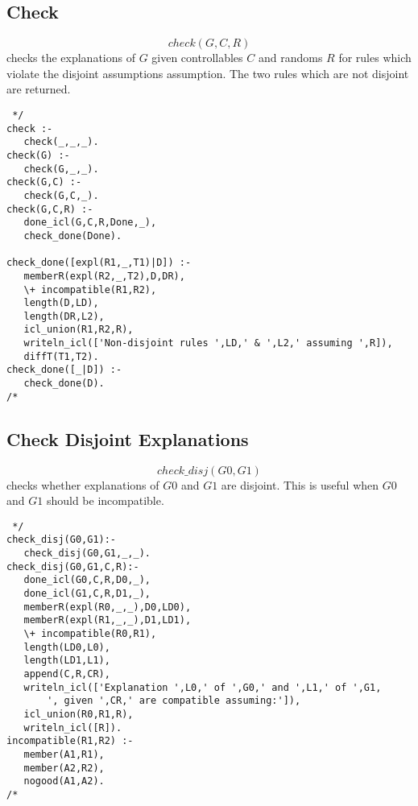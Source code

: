 \documentclass[11pt,fleqn]{article}
\begin{document}
\subsection{Check}
\[check(G,C,R)\] 
checks the explanations of $G$ given controllables $C$ and randoms $R$ 
for rules which violate the disjoint
assumptions assumption. The two rules which are not disjoint are returned.

\begin{verbatim} */
check :- 
   check(_,_,_).
check(G) :-
   check(G,_,_).
check(G,C) :-
   check(G,C,_).
check(G,C,R) :-
   done_icl(G,C,R,Done,_),
   check_done(Done).

check_done([expl(R1,_,T1)|D]) :-
   memberR(expl(R2,_,T2),D,DR),
   \+ incompatible(R1,R2),
   length(D,LD),
   length(DR,L2),
   icl_union(R1,R2,R),
   writeln_icl(['Non-disjoint rules ',LD,' & ',L2,' assuming ',R]),
   diffT(T1,T2).
check_done([_|D]) :-
   check_done(D).
/* \end{verbatim}

\subsection{Check Disjoint Explanations}
\[check\_disj(G0,G1)\] 
checks whether explanations of $G0$ and $G1$ are disjoint. This is useful when $G0$ and $G1$ should be incompatible.
\begin{verbatim} */
check_disj(G0,G1):-
   check_disj(G0,G1,_,_).
check_disj(G0,G1,C,R):-
   done_icl(G0,C,R,D0,_),
   done_icl(G1,C,R,D1,_),
   memberR(expl(R0,_,_),D0,LD0),
   memberR(expl(R1,_,_),D1,LD1),
   \+ incompatible(R0,R1),
   length(LD0,L0),
   length(LD1,L1),
   append(C,R,CR),
   writeln_icl(['Explanation ',L0,' of ',G0,' and ',L1,' of ',G1,
       ', given ',CR,' are compatible assuming:']),
   icl_union(R0,R1,R),
   writeln_icl([R]).
incompatible(R1,R2) :-
   member(A1,R1),
   member(A2,R2),
   nogood(A1,A2).
/* \end{verbatim}
\end{document}

